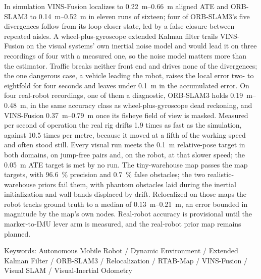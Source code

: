 In simulation VINS-Fusion localizes to \SIrange{0.22}{0.66}{\metre} aligned
ATE and ORB-SLAM3 to \SIrange{0.14}{0.52}{\metre} in eleven runs of sixteen;
four of ORB-SLAM3's five divergences follow from its loop-closer state, led
by a false closure between repeated aisles. A wheel-plus-gyroscope extended Kalman filter
trails VINS-Fusion on the visual systems' own inertial noise model and would
lead it on three recordings of four with a measured one, so the noise model
matters more than the estimator. Traffic
breaks neither front end and drives none of the divergences; the one
dangerous case, a vehicle leading the robot, raises the local error two- to
eightfold for four seconds and leaves under \SI{0.1}{\metre} in the
accumulated error. On four real-robot recordings, one of them a diagnostic, ORB-SLAM3 holds
\SIrange{0.19}{0.48}{\metre}, in the same accuracy class as wheel-plus-gyroscope
dead reckoning, and VINS-Fusion \SIrange{0.37}{0.79}{\metre} once its fisheye
field of view is masked. Measured per second of operation the real rig drifts
1.9 times as fast as the simulation, against 10.5 times per metre, because it
moved at a fifth of the working speed and often stood still. Every visual run meets the
\SI{0.1}{\metre} relative-pose target in both domains, on jump-free pairs and, on the robot, at
that slower speed; the
\SI{0.05}{\metre} ATE target is met by no run. The tiny-warehouse map passes the map targets, with
\SI{96.6}{\percent} precision and \SI{0.7}{\percent} false obstacles; the two
realistic-warehouse priors fail them, with phantom obstacles laid during the
inertial initialization and wall bands displaced by drift. Relocalized on those maps the robot tracks ground
truth to a median of \SIrange{0.13}{0.21}{\metre}, an error bounded in magnitude by
the map's own nodes. Real-robot accuracy is provisional until the
marker-to-IMU lever arm is measured, and the real-robot prior map remains
planned.

\vspace{6mm}
\noindent Keywords: Autonomous Mobile Robot / Dynamic Environment /
Extended Kalman Filter / ORB-SLAM3 / Relocalization / RTAB-Map / VINS-Fusion /
Visual SLAM / Visual-Inertial Odometry
\clearpage


